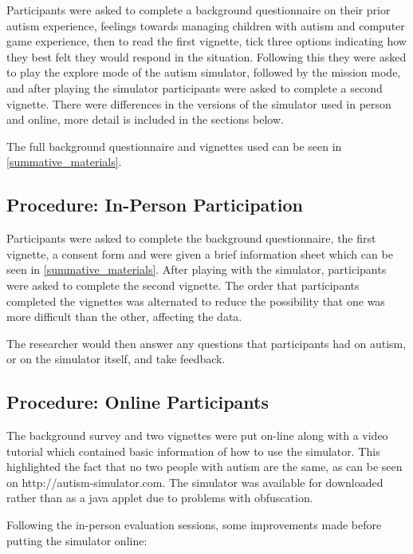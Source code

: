 \documentclass[11pt]{report}
\begin{document}
Participants were asked to complete a background questionnaire on their prior autism experience, feelings towards managing children with autism and computer game experience, then to read the first vignette, tick three options indicating how they best felt they would respond in the situation. Following this they were asked to play the explore mode of the autism simulator, followed by the mission mode, and after playing the simulator participants were asked to complete a second vignette. There were differences in the versions of the simulator used in person and online, more detail is included in the sections below. 

The full background questionnaire and vignettes used can be seen in \ref{summative_materials}.


\subsection{Procedure: In-Person Participation}

Participants were asked to complete the background questionnaire, the first vignette, a consent form and were given a brief information sheet which can be seen in \ref{summative_materials}. After playing with the simulator, participants were asked to complete the second vignette. The order that participants completed the vignettes was alternated to reduce the possibility that one was more difficult than the other, affecting the data. 

The researcher would then answer any questions that participants had on autism, or on the simulator itself, and take feedback. 

\subsection{Procedure: Online Participants}

The background survey and two vignettes were put on-line along with a video tutorial which contained basic information of how to use the simulator. This highlighted the fact that no two people with autism are the same, as can be seen on http://autism-simulator.com. The simulator was available for downloaded rather than as a java applet due to problems with obfuscation. 

Following the in-person evaluation sessions, some improvements made before putting the simulator online: 
\end{document}
